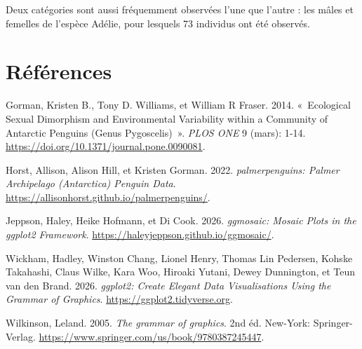 \documentclass[
  a4paper,
  DIV=11,
  numbers=noendperiod,
  oneside]{scrreprt}
\newlength{\cslhangindent}
\newenvironment{CSLReferences}[2] %
 {\begin{list}{}{%
  \setlength{\itemindent}{0pt}
  \setlength{\leftmargin}{0pt}
  \setlength{\parsep}{0pt}
  \ifodd #1
   \setlength{\leftmargin}{\cslhangindent}
   \setlength{\itemindent}{-1\cslhangindent}
  \fi
  \setlength{\itemsep}{#2\baselineskip}}}
 {\end{list}}
\begin{document}
Deux catégories sont aussi fréquemment observées l'une que l'autre : les
mâles et femelles de l'espèce Adélie, pour lesquels 73 individus ont été
observés.


\chapter*{Références}\label{ruxe9fuxe9rences}


\label{refs}
\begin{CSLReferences}{1}{0}
Gorman, Kristen B., Tony D. Williams, et William R Fraser. 2014.
{«~Ecological Sexual Dimorphism and Environmental Variability within a
Community of Antarctic Penguins (Genus Pygoscelis)~»}. \emph{PLOS ONE} 9
(mars): 1‑14. \url{https://doi.org/10.1371/journal.pone.0090081}.

Horst, Allison, Alison Hill, et Kristen Gorman. 2022.
\emph{palmerpenguins: Palmer Archipelago (Antarctica) Penguin Data}.
\url{https://allisonhorst.github.io/palmerpenguins/}.

Jeppson, Haley, Heike Hofmann, et Di Cook. 2026. \emph{ggmosaic: Mosaic
Plots in the ggplot2 Framework}.
\url{https://haleyjeppson.github.io/ggmosaic/}.

Wickham, Hadley, Winston Chang, Lionel Henry, Thomas Lin Pedersen,
Kohske Takahashi, Claus Wilke, Kara Woo, Hiroaki Yutani, Dewey
Dunnington, et Teun van den Brand. 2026. \emph{ggplot2: Create Elegant
Data Visualisations Using the Grammar of Graphics}.
\url{https://ggplot2.tidyverse.org}.

Wilkinson, Leland. 2005. \emph{The grammar of graphics}. 2nd éd.
New-York: Springer-Verlag.
\url{https://www.springer.com/us/book/9780387245447}.

\end{CSLReferences}
\end{document}

